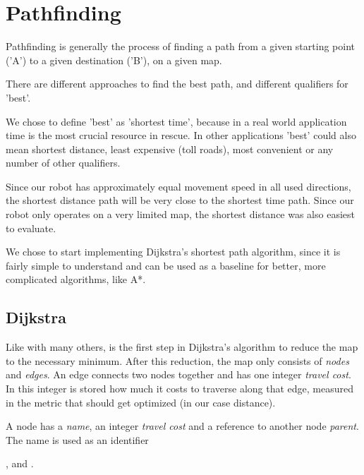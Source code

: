 \chapter{Pathfinding}\label{ch:path}
Pathfinding is generally the process of finding a path from a given starting point ('A')
to a given destination ('B'),
on a given map.

There are different approaches to find the best path,
and different qualifiers for 'best'.

We chose to define 'best' as 'shortest time',
because in a real world application time is the most crucial resource in rescue.
In other applications 'best' could also mean shortest distance, least expensive (toll roads),
most convenient or any number of other qualifiers.

Since our robot has approximately equal movement speed in all used directions,
the shortest distance path will be very close to the shortest time path.
Since our robot only operates on a very limited map,
the shortest distance was also easiest to evaluate.

We chose to start implementing Dijkstra's shortest path algorithm,
since it is fairly simple to understand
and can be used as a baseline for better, more complicated algorithms,
like A*.

\section{Dijkstra}
Like with many others,
is the first step in Dijkstra's algorithm to reduce the map to the necessary minimum.
After this reduction, the map only consists of \emph{nodes} and \emph{edges}.
An edge connects two nodes together and has one integer \emph{travel cost}.
In this integer is stored how much it costs to traverse along that edge,
measured in the metric that should get optimized (in our case distance).

A node has a \emph{name}, an integer \emph{travel cost} and a reference to another node \emph{parent}.
The name is used as an identifier


\cite{Madsen2010}, \cite{Oetiker2010} and \cite{Mittelbach2005}.
